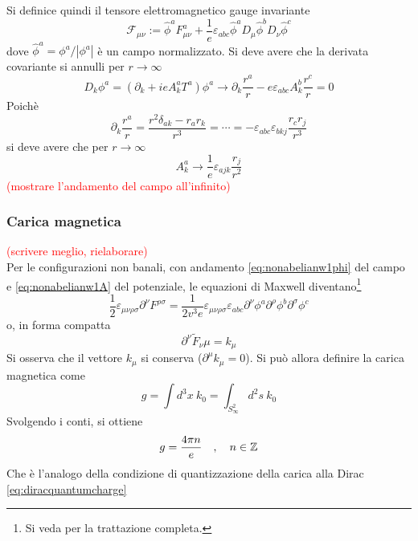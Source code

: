 Si definice quindi il tensore elettromagnetico gauge invariante
\begin{equation}
   \mathcal{F}_{\mu\nu} := \hat{\phi}^a F^a_{\mu\nu}
          + \frac{1}{e} \varepsilon_{abc} \hat{\phi}^a D_\mu\hat{\phi}^b D_\nu \hat{\phi}^c
\end{equation}
dove $\hat{\phi}^a = \phi^a/|\phi^a|$ è un campo normalizzato. Si deve avere che
la derivata covariante si annulli per $r \to \infty$
$$
   D _k \phi^a = (\partial _k + ie A _k ^a T^a) \phi^a
      \to \partial _k \frac{r^a}{r}  - e \varepsilon_{abc} A^b_k \frac{r^c}{r}
      = 0
$$
Poichè
$$
   \partial _k \frac{r^a}{r} = \frac{r^2 \delta _{ak} - r_a r_k}{r^3}
      = \cdots
      = - \varepsilon _{abc}\varepsilon _{bkj} \frac{r_c r_j}{r^3}
$$
si deve avere che per $r \to \infty$
$$
   A^a_k \to \frac{1}{e} \varepsilon _{ajk} \frac{r_j}{r^2} 
$$
\textcolor{red}{(mostrare l'andamento del campo all'infinito)}\\

\subsubsection{Carica magnetica}
\textcolor{red}{(scrivere meglio, rielaborare)}\\
Per le configurazioni non banali, con andamento \ref{eq:nonabelianw1phi} del campo
e \ref{eq:nonabelianw1A} del potenziale, le equazioni di Maxwell diventano\footnote{
   Si veda \cite{nakahara} per la trattazione completa.
}
$$
   \frac{1}{2} \varepsilon_{\mu\nu\rho\sigma} \partial ^\nu F^{\rho\sigma} =
       \frac{1}{2 v^3 e} \varepsilon_{\mu\nu\rho\sigma}\varepsilon_{abc}
       \partial^\nu \phi^a \partial^\rho \phi^b \partial^\sigma \phi^c
$$
o, in forma compatta
$$
   \partial ^\nu \tilde{F}_\nu\mu = k_\mu
$$
Si osserva che il vettore $k_\mu$ si conserva ($\partial ^\mu k_\mu = 0$).
Si può allora definire la carica magnetica come
$$
   g = \int d^3 x \: k_0 = \int_{S^2_\infty} d^2s \: k_0
$$
Svolgendo i conti, si ottiene
\begin{equation}\label{eq:nonabelianquantumcharge}
   g = \frac{4\pi n}{e} \quad,\quad n \in \mathbb{Z}
\end{equation}
Che è l'analogo della condizione di quantizzazione della carica alla Dirac
\ref{eq:diracquantumcharge}

